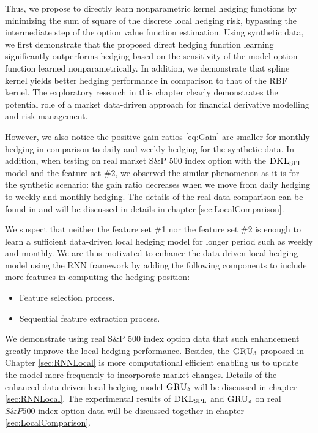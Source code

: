 \documentclass[letterpaper,12pt,titlepage,oneside,final]{book}
\numberwithin{equation}{section}
\theoremstyle{definition}
\newcommand{\model}{\textsc{GRU}_\delta}
\newcommand{\DKLs}{\bf\textsc{DKL}_{\text{SPL}}}
\begin{document}
Thus, we propose to directly learn nonparametric kernel hedging functions by minimizing the sum of square of the discrete local hedging risk, bypassing the intermediate step of the option value function estimation. Using synthetic data, we first demonstrate that the proposed direct hedging function learning significantly outperforms hedging based on the sensitivity of the model option function learned nonparametrically. In addition, we demonstrate that spline kernel yields better hedging performance in comparison to that of the RBF kernel. The exploratory research in this chapter clearly demonstrates the potential role of a market data-driven approach for financial derivative modelling and risk management. 

However, we also notice the positive gain ratios \eqref{eq:Gain} are  smaller for monthly hedging in comparison to daily and weekly hedging for the synthetic data. 
In addition, when testing on real market S\&P 500 index option with the $\DKLs$ model and the  feature set \#2,  we observed the similar phenomenon as it is for the synthetic scenario: the gain ratio decreases when we move from daily hedging to weekly and monthly hedging. The details of the real data comparison can be found in \cite{knian2017} and will be discussed in details in chapter \ref{sec:LocalComparison}.

We suspect that neither the  feature set \#1 nor the  feature set \#2 is enough to learn a sufficient data-driven local hedging model for longer period such as weekly  and monthly.  We are thus motivated to enhance the data-driven local hedging model using  the RNN framework by adding the following components to include more features in computing the hedging position:
\begin{itemize}
\item  Feature selection process.
\item  Sequential feature extraction process.
\end{itemize}
We demonstrate using real S\&P 500 index option data that such enhancement greatly improve the local hedging performance.
Besides, the $\model$ proposed in Chapter \ref{sec:RNNLocal} is more computational efficient enabling  us to update the model more frequently to incorporate market changes.
Details of the enhanced data-driven local hedging model $\model$ will be discussed in chapter \ref{sec:RNNLocal}. The experimental results of $\DKLs$ and $\model$ on real $S\&P 500$ index option data will be discussed together in chapter \ref{sec:LocalComparison}.
\end{document}
